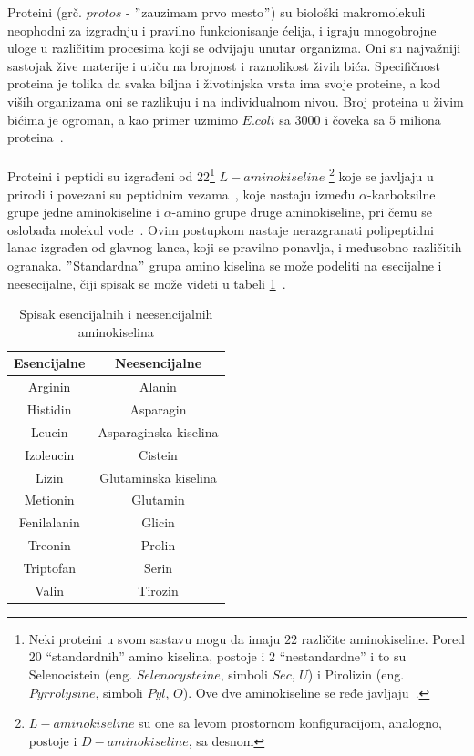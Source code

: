 Proteini (grč. $protos$ - $"$zauzimam prvo mesto$"$) su biološki makromolekuli neophodni za izgradnju i pravilno funkcionisanje ćelija, i igraju mnogobrojne uloge u različitim procesima koji se odvijaju unutar organizma. Oni su najvažniji sastojak žive materije i utiču na brojnost i raznolikost živih bića. Specifičnost proteina je tolika da svaka biljna i životinjska vrsta ima svoje proteine, a kod viših organizama oni se razlikuju i na individualnom nivou. Broj proteina u živim bićima je ogroman, a kao primer uzmimo $E. coli$ sa $3000$ i čoveka sa $5$ miliona proteina~\cite{spasic}. \\\\
Proteini i peptidi su izgrađeni od $22$\footnote{Neki proteini u svom sastavu mogu da imaju $22$ različite aminokiseline. Pored $20$ “standardnih” amino kiselina,
postoje i $2$ “nestandardne” i to su Selenocistein (eng. $Selenocysteine$, simboli $Sec$, $U$) i Pirolizin (eng. $Pyrrolysine$,
simboli $Pyl$, $O$). Ove dve aminokiseline se ređe javljaju~\cite{MarijaJ}.} $L-aminokiseline$ \footnote{$L-aminokiseline$ su one sa levom prostornom konfiguracijom, analogno, postoje i $D-aminokiseline$, sa desnom} koje se javljaju u prirodi i povezani su peptidnim vezama~\cite{biopathways}, koje nastaju između $\alpha$-karboksilne grupe jedne aminokiseline i $\alpha$-amino grupe druge aminokiseline, pri čemu se oslobađa molekul vode~\cite{MarijaJ}. Ovim postupkom nastaje nerazgranati polipeptidni lanac izgrađen od glavnog lanca, koji se pravilno ponavlja, i međusobno različitih ogranaka. $"$Standardna$"$ grupa amino kiselina se može podeliti na esecijalne i
neesecijalne, čiji spisak se može videti u tabeli \ref{table:1}~\cite{MarijaJ}. 
\begin{table}[h!]
\centering
	\begin{tabular}{||c c||} 
	\hline 
	Esencijalne & Neesencijalne \\ [0.5ex] 
	\hline\hline
	Arginin & Alanin \\ 
	\hline
	Histidin & Asparagin \\
	\hline
	Leucin & Asparaginska kiselina\\
	\hline
	Izoleucin & Cistein \\
	\hline
	Lizin & Glutaminska kiselina \\ [1ex] 
	\hline
	Metionin & Glutamin \\ [1ex] 
	\hline
	Fenilalanin & Glicin \\ [1ex] 
	\hline
	Treonin & Prolin \\ [1ex] 
	\hline
	Triptofan & Serin \\ [1ex] 
	\hline
	Valin & Tirozin \\ [1ex] 
	\hline
	\end{tabular}
\caption{Spisak esencijalnih i neesencijalnih aminokiselina}
\label{table:1}
\end{table}
